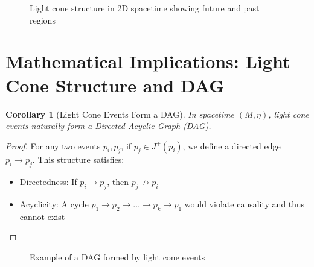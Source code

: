 \documentclass{article}
\newtheorem{corollary}{Corollary}
\begin{document}
\begin{figure}[h]
\centering
{}
\caption{Light cone structure in 2D spacetime showing future and past regions}
\label{fig:lightcone}
\end{figure}

\section{Mathematical Implications: Light Cone Structure and DAG}

\begin{corollary}[Light Cone Events Form a DAG]
In spacetime $(M, \eta)$, light cone events naturally form a Directed Acyclic Graph (DAG).
\end{corollary}

\begin{proof}
For any two events $p_i, p_j$, if $p_j \in J^+(p_i)$, we define a directed edge $p_i \to p_j$. This structure satisfies:
\begin{itemize}
    \item Directedness: If $p_i \to p_j$, then $p_j \not\to p_i$
    \item Acyclicity: A cycle $p_1 \to p_2 \to \dots \to p_k \to p_1$ would violate causality and thus cannot exist
\end{itemize}
\end{proof}

\begin{figure}[h]
\centering
{}
\caption{Example of a DAG formed by light cone events}
\label{fig:dag}
\end{figure}
\end{document}

